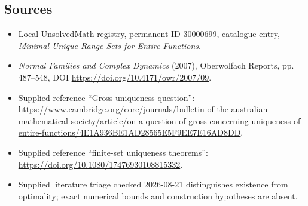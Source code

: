 \documentclass[11pt]{article}
\begin{document}
\subsection{Sources}
\begin{itemize}
\item Local UnsolvedMath registry, permanent ID 30000699, catalogue entry, \emph{Minimal Unique-Range Sets for Entire Functions}.
\item \emph{Normal Families and Complex Dynamics} (2007), Oberwolfach Reports, pp. 487--548, DOI \url{https://doi.org/10.4171/owr/2007/09}.
\item Supplied reference ``Gross uniqueness question'': \url{https://www.cambridge.org/core/journals/bulletin-of-the-australian-mathematical-society/article/on-a-question-of-gross-concerning-uniqueness-of-entire-functions/4E1A936BE1AD28565E5F9EE7E16AD8DD}.
\item Supplied reference ``finite-set uniqueness theorems'': \url{https://doi.org/10.1080/17476930108815332}.
\item Supplied literature triage checked 2026-08-21 distinguishes existence from optimality; exact numerical bounds and construction hypotheses are absent.
\end{itemize}
\end{document}
